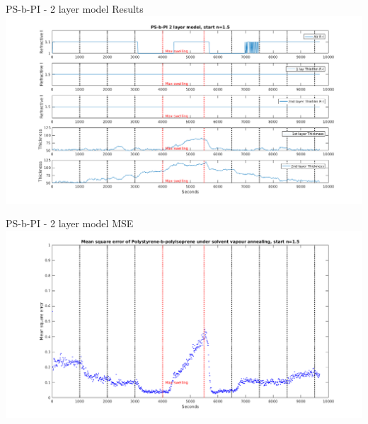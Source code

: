 \documentclass[10pt]{beamer}
\begin{document}

\begin{frame}{PS-b-PI - 2 layer model Results}
\centering
\includegraphics[width=\textwidth]{Results_2layer_PSbPI_n15.png}
\end{frame}

\begin{frame}{PS-b-PI - 2 layer model MSE}
\centering
\includegraphics[width=\textwidth]{MSE_2layer_PSbPI_n15.png}
\end{frame}
\end{document}
